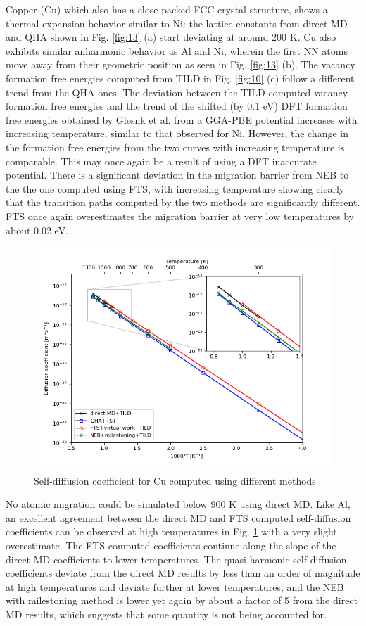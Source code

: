 \documentclass{article}
\begin{document}
Copper (Cu) which also has a close packed FCC crystal structure, shows a thermal expansion behavior similar to Ni: the lattice constants from direct MD and QHA shown in Fig. \ref{fig:13} (a) start deviating at around 200 K. Cu also exhibits similar anharmonic behavior as Al and Ni, wherein the first NN atoms move away from their geometric position as seen in Fig. \ref{fig:13} (b). The vacancy formation free energies computed from TILD in Fig. \ref{fig:10} (c) follow a different trend from the QHA ones. The deviation between the TILD computed vacancy formation free energies and the trend of the shifted (by 0.1 eV) DFT formation free energies obtained by Glesnk et al. \cite{Glensk2013} from a GGA-PBE potential increases with increasing temperature, similar to that observed for Ni. However, the change in the formation free energies from the two curves with increasing temperature is comparable. This may once again be a result of using a DFT inaccurate potential. There is a significant deviation in the migration barrier from NEB to the the one computed using FTS, with increasing temperature showing clearly that the transition paths computed by the two methods are significantly different. FTS once again overestimates the migration barrier at very low temperatures by about 0.02 eV. 

\begin{figure}[htp]
\centering
\includegraphics[scale=0.65]{cu_self_diffusion}
\caption{Self-diffusion coefficient for Cu computed using different methods}
\label{fig:14}
\end{figure}

No atomic migration could be simulated below 900 K using direct MD. Like Al, an excellent agreement between the direct MD and FTS computed self-diffusion coefficients can be observed at high temperatures in Fig. \ref{fig:14} with a very slight overestimate. The FTS computed coefficients continue along the slope of the direct MD coefficients to lower temperatures. The quasi-harmonic self-diffusion coefficients deviate from the direct MD results by less than an order of magnitude at high temperatures and deviate further at lower temperatures, and the NEB with milestoning method is lower yet again by about a factor of 5 from the direct MD results, which suggests that some quantity is not being accounted for.
\end{document}
